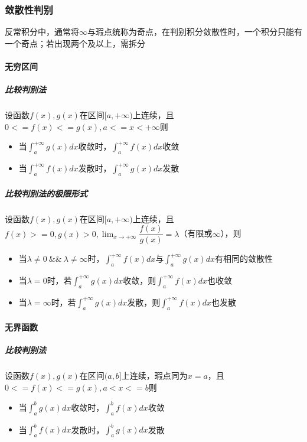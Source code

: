 \subsubsection{敛散性判别}

反常积分中，通常将\(\infty\)与瑕点统称为奇点，在判别积分敛散性时，一个积分只能有一个奇点；若出现两个及以上，需拆分

\paragraph{无穷区间}

\subparagraph{比较判别法}
设函数\(f(x), g(x)\)在区间\([a, +\infty)\)上连续，且\(0 <= f(x) <= g(x), a <= x < +\infty\)则
\begin{itemize}
    \item 当\(\displaystyle\int_a^{+\infty}g(x)dx\)收敛时，\(\displaystyle\int_a^{+\infty}f(x)dx\)收敛
    \item 当\(\displaystyle\int_a^{+\infty}f(x)dx\)发散时，\(\displaystyle\int_a^{+\infty}g(x)dx\)发散
\end{itemize}

\subparagraph{比较判别法的极限形式}
设函数\(f(x), g(x)\)在区间\([a, +\infty)\)上连续，且\(f(x) >= 0, g(x) > 0, \displaystyle\lim_{x \to +\infty}\dfrac{f(x)}{g(x)} = \lambda\)（有限或\(\infty\)），则
\begin{itemize}
    \item 当\(\lambda \neq 0\ \&\&\ \lambda \neq \infty\)时，\(\displaystyle\int_a^{+\infty}f(x)dx\)与\(\displaystyle\int_a^{+\infty}g(x)dx\)有相同的敛散性
    \item 当\(\lambda = 0\)时，若\(\displaystyle\int_a^{+\infty}g(x)dx\)收敛，则\(\displaystyle\int_a^{+\infty}f(x)dx\)也收敛
    \item 当\(\lambda = \infty\)时，若\(\displaystyle\int_a^{+\infty}g(x)dx\)发散，则\(\displaystyle\int_a^{+\infty}f(x)dx\)也发散
\end{itemize}


\paragraph{无界函数}

\subparagraph{比较判别法}
设函数\(f(x), g(x)\)在区间\((a, b]\)上连续，瑕点同为\(x = a\)，且\(0 <= f(x) <= g(x), a < x <= b \)则
\begin{itemize}
    \item 当\(\displaystyle\int_a^{b}g(x)dx\)收敛时，\(\displaystyle\int_a^{b}f(x)dx\)收敛
    \item 当\(\displaystyle\int_a^{b}f(x)dx\)发散时，\(\displaystyle\int_a^{b}g(x)dx\)发散
\end{itemize}

